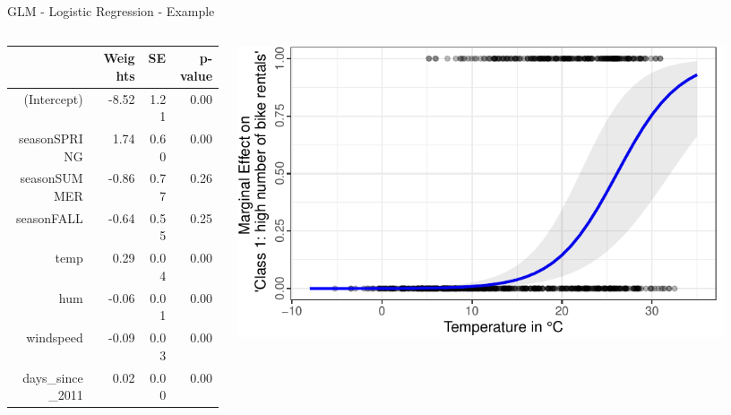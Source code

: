 \documentclass[10pt,compress,t,notes=noshow, xcolor=table]{beamer}
\begin{document}
\begin{frame}{GLM - Logistic Regression - Example}
\begin{columns}[T, totalwidth = \textwidth]
\begin{column}{0.55\textwidth}
\centering
\begin{scriptsize}
\begin{tabular}{rrrr}
  \hline
 & Weights & SE & p-value \\ 
  \hline
(Intercept) & -8.52 & 1.21 & 0.00 \\ 
  seasonSPRING & 1.74 & 0.60 & 0.00 \\ 
  seasonSUMMER & -0.86 & 0.77 & 0.26 \\ 
  seasonFALL & -0.64 & 0.55 & 0.25 \\ 
  temp & 0.29 & 0.04 & 0.00 \\ 
  hum & -0.06 & 0.01 & 0.00 \\ 
  windspeed & -0.09 & 0.03 & 0.00 \\ 
  days\_since\_2011 & 0.02 & 0.00 & 0.00 \\ 
   \hline
\end{tabular}
\end{scriptsize}
\pause
\end{column}
\hfill
\begin{column}{0.45\textwidth}
\includegraphics[width = 0.9\textwidth]{figure/logistic_marginal_temp.pdf}
\end{column}
\end{columns}


\end{frame}
\end{document}
